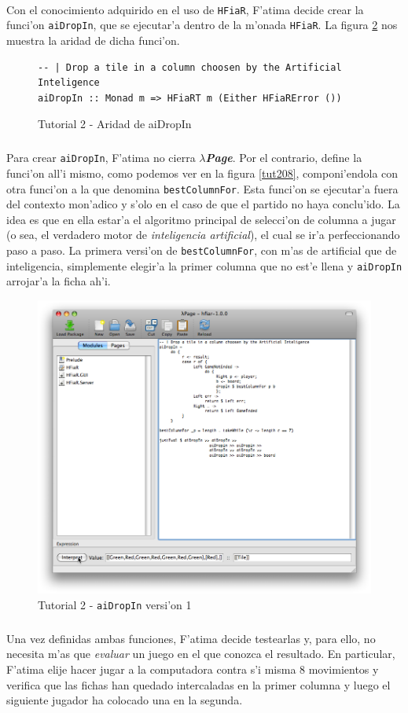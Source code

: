 \documentclass[a4paper]{article}
\newcommand{\hpage}{\textbf{\textsl{$\lambda$Page}}}
\begin{document}
\paragraph{}Con el conocimiento adquirido en el uso de \texttt{HFiaR}, F'atima decide crear la funci'on \texttt{aiDropIn}, que se ejecutar'a dentro de la m'onada \texttt{HFiaR}.  La figura \ref{tut207} nos muestra la aridad de dicha funci'on.
\begin{figure}[hp]
	\begin{center}
		\begin{lstlisting}
-- | Drop a tile in a column choosen by the Artificial Inteligence
aiDropIn :: Monad m => HFiaRT m (Either HFiaRError ())
		\end{lstlisting}
		\caption{Tutorial 2 - Aridad de aiDropIn}
		\label{tut207}
	\end{center}
\end{figure}
\subparagraph{}Para crear \texttt{aiDropIn}, F'atima no cierra \hpage.  Por el contrario, define la funci'on all'i mismo, como podemos ver en la figura \ref{tut208}, componi'endola con otra funci'on a la que denomina \texttt{bestColumnFor}.  Esta funci'on se ejecutar'a fuera del contexto mon'adico y s'olo en el caso de que el partido no haya conclu'ido.  La idea es que en ella estar'a el algoritmo principal de selecci'on de columna a jugar (o sea, el verdadero motor de \textsl{inteligencia artificial}), el cual se ir'a perfeccionando paso a paso.  La primera versi'on de \texttt{bestColumnFor}, con m'as de artificial que de inteligencia, simplemente elegir'a la primer columna que no est'e llena y \texttt{aiDropIn} arrojar'a la ficha ah'i.
\begin{figure}[hp]
	\begin{center}
        	\includegraphics[width=.75\textwidth]{pictures/tut2/06}
		\caption{Tutorial 2 - \texttt{aiDropIn} versi'on 1}
		\label{tut207}
	\end{center}
\end{figure}
\subparagraph{}Una vez definidas ambas funciones, F'atima decide testearlas y, para ello, no necesita m'as que \textsl{evaluar} un juego en el que conozca el resultado.  En particular, F'atima elije hacer jugar a la computadora contra s'i misma 8 movimientos y verifica que las fichas han quedado intercaladas en la primer columna y luego el siguiente jugador ha colocado una en la segunda.
\end{document}
